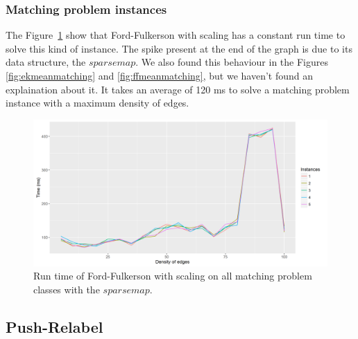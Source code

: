 \subsubsection{Matching problem instances}
The Figure~\ref{fig:ffmatching} show that Ford-Fulkerson with scaling has a constant run time to solve this kind of instance. The spike present at the end of the graph is due to its data structure, the $sparse map$. We also found this behaviour in the Figures \ref{fig:ekmeanmatching} and \ref{fig:ffmeanmatching}, but we haven't found an explaination about it. It takes an average of 120 ms to solve a matching problem instance with a maximum density of edges.
\begin{figure}[H]
\begin{center}
\includegraphics[scale=0.5]{images/results/ffmatching.png}
\caption{Run time of Ford-Fulkerson with scaling on all matching problem classes with the $sparse map$.}
\label{fig:ffmatching}
\end{center}
\end{figure}


\subsection{Push-Relabel}
